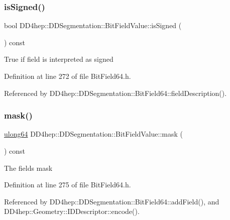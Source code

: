 \subsubsection{\texorpdfstring{is\+Signed()}{isSigned()}}
{\footnotesize\ttfamily bool D\+D4hep\+::\+D\+D\+Segmentation\+::\+Bit\+Field\+Value\+::is\+Signed (\begin{DoxyParamCaption}{ }\end{DoxyParamCaption}) const\hspace{0.3cm}{\ttfamily [inline]}}

True if field is interpreted as signed 

Definition at line 272 of file Bit\+Field64.\+h.



Referenced by D\+D4hep\+::\+D\+D\+Segmentation\+::\+Bit\+Field64\+::field\+Description().

\hypertarget{class_d_d4hep_1_1_d_d_segmentation_1_1_bit_field_value_a537266df448c372b64ea6c4f1185a4c5}{}\label{class_d_d4hep_1_1_d_d_segmentation_1_1_bit_field_value_a537266df448c372b64ea6c4f1185a4c5} 
\subsubsection{\texorpdfstring{mask()}{mask()}}
{\footnotesize\ttfamily \hyperlink{namespace_d_d4hep_a7a8348d075fd0a3bafc06de7cde7a750}{ulong64} D\+D4hep\+::\+D\+D\+Segmentation\+::\+Bit\+Field\+Value\+::mask (\begin{DoxyParamCaption}{ }\end{DoxyParamCaption}) const\hspace{0.3cm}{\ttfamily [inline]}}

The field\textquotesingle{}s mask 

Definition at line 275 of file Bit\+Field64.\+h.



Referenced by D\+D4hep\+::\+D\+D\+Segmentation\+::\+Bit\+Field64\+::add\+Field(), and D\+D4hep\+::\+Geometry\+::\+I\+D\+Descriptor\+::encode().

\hypertarget{class_d_d4hep_1_1_d_d_segmentation_1_1_bit_field_value_a9f9c250d23c05ff2695d9ec4e2b7ffc9}{}\label{class_d_d4hep_1_1_d_d_segmentation_1_1_bit_field_value_a9f9c250d23c05ff2695d9ec4e2b7ffc9} 
